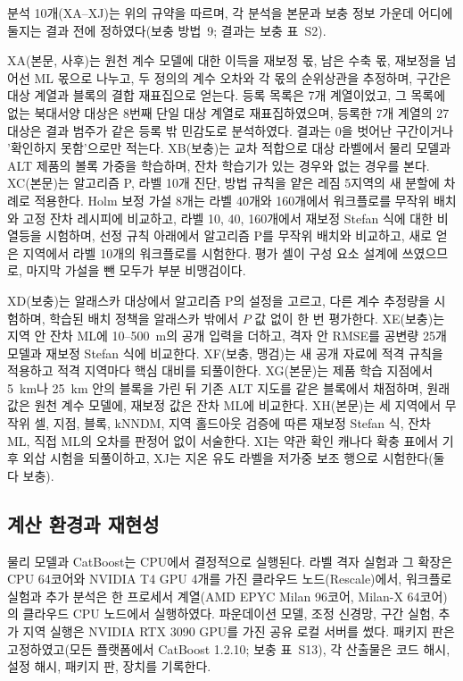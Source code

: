 분석 10개(XA--XJ)는 위의 규약을 따르며, 각 분석을 본문과 보충 정보 가운데 어디에 둘지는 결과 전에 정하였다(보충 방법~9; 결과는 보충 표~S2).

XA(본문, 사후)는 원천 계수 모델에 대한 이득을 재보정 몫, 남은 수축 몫, 재보정을 넘어선 ML 몫으로 나누고, 두 정의의 계수 오차와 각 몫의 순위상관을 추정하며, 구간은 대상 계열과 블록의 결합 재표집으로 얻는다. 등록 목록은 7개 계열이었고, 그 목록에 없는 북대서양 대상은 8번째 단일 대상 계열로 재표집하였으며, 등록한 7개 계열의 27대상은 결과 범주가 같은 등록 밖 민감도로 분석하였다. 결과는 0을 벗어난 구간이거나 '확인하지 못함'으로만 적는다. XB(보충)는 교차 적합으로 대상 라벨에서 물리 모델과 ALT 제품의 볼록 가중을 학습하며, 잔차 학습기가 있는 경우와 없는 경우를 본다. XC(본문)는 알고리즘 P, 라벨 10개 진단, 방법 규칙을 얕은 레짐 5지역의 새 분할에 차례로 적용한다. Holm 보정 가설 8개는 라벨 40개와 160개에서 워크플로를 무작위 배치와 고정 잔차 레시피에 비교하고, 라벨 10, 40, 160개에서 재보정 Stefan 식에 대한 비열등을 시험하며, 선정 규칙 아래에서 알고리즘 P를 무작위 배치와 비교하고, 새로 얻은 지역에서 라벨 10개의 워크플로를 시험한다. 평가 셀이 구성 요소 설계에 쓰였으므로, 마지막 가설을 뺀 모두가 부분 비맹검이다.

XD(보충)는 알래스카 대상에서 알고리즘 P의 설정을 고르고, 다른 계수 추정량을 시험하며, 학습된 배치 정책을 알래스카 밖에서 $P$ 값 없이 한 번 평가한다. XE(보충)는 지역 안 잔차 ML에 10--500~m의 공개 입력을 더하고, 격자 안 RMSE를 공변량 25개 모델과 재보정 Stefan 식에 비교한다. XF(보충, 맹검)는 새 공개 자료에 적격 규칙을 적용하고 적격 지역마다 핵심 대비를 되풀이한다. XG(본문)는 제품 학습 지점에서 5~km나 25~km 안의 블록을 가린 뒤 기존 ALT 지도를 같은 블록에서 채점하며, 원래 값은 원천 계수 모델에, 재보정 값은 잔차 ML에 비교한다. XH(본문)는 세 지역에서 무작위 셀, 지점, 블록, kNNDM, 지역 홀드아웃 검증에 따른 재보정 Stefan 식, 잔차 ML, 직접 ML의 오차를 판정어 없이 서술한다. XI는 약관 확인 캐나다 확충 표에서 기후 외삽 시험을 되풀이하고, XJ는 지온 유도 라벨을 저가중 보조 행으로 시험한다(둘 다 보충).

\subsection{계산 환경과 재현성}\label{sec:m-computing}

물리 모델과 CatBoost는 CPU에서 결정적으로 실행된다. 라벨 격자 실험과 그 확장은 CPU 64코어와 NVIDIA T4 GPU 4개를 가진 클라우드 노드(Rescale)에서, 워크플로 실험과 추가 분석은 한 프로세서 계열(AMD EPYC Milan 96코어, Milan-X 64코어)의 클라우드 CPU 노드에서 실행하였다. 파운데이션 모델, 조정 신경망, 구간 실험, 추가 지역 실행은 NVIDIA RTX 3090 GPU를 가진 공유 로컬 서버를 썼다. 패키지 판은 고정하였고(모든 플랫폼에서 CatBoost 1.2.10; 보충 표~S13), 각 산출물은 코드 해시, 설정 해시, 패키지 판, 장치를 기록한다.

